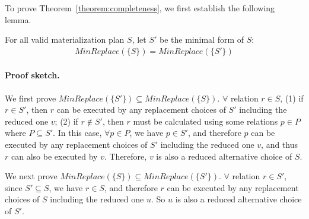 To prove Theorem~\ref{theorem:completeness}, we first establish the following lemma.

\begin{lemma}\label{lemma:reduce-replace}
    For all valid materialization plan $S$, 
    let $S'$ be the minimal form of $S$:
    \begin{align*}
        MinReplace(\{S\}) = MinReplace(\{S'\})
    \end{align*}
\end{lemma}

\paragraph{Proof sketch.}
We first prove $MinReplace(\{S'\}) \subseteq MinReplace(\{S\})$. $\forall$ relation $r \in S$, (1) if $r \in S'$, then $r$ can be executed by any replacement choices of $S'$ including the reduced one $v$; (2) if $r \notin S'$, then $r$ must be calculated using some relations $p \in P$ where $P \subseteq S'$. In this case, $\forall p \in P$, we have $p \in S'$, and therefore $p$ can be executed by any replacement choices of $S'$ including the reduced one $v$, and thus $r$ can also be executed by $v$. Therefore, $v$ is also a reduced alternative choice of $S$.

We next prove $MinReplace(\{S\}) \subseteq MinReplace(\{S'\})$.
$\forall$ relation $r \in S'$, since $S' \subseteq S$, we have $r \in S$, and therefore $r$ can be executed by any replacement choices of $S$ including the reduced one $u$. So $u$ is also a reduced alternative choice of $S'$.


